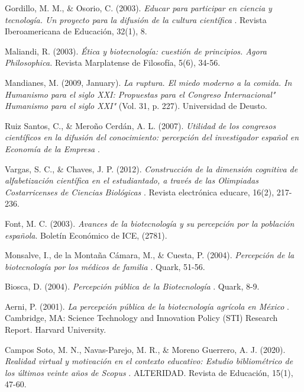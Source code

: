 \documentclass[12pt]{article}
\begin{document}
\newpage
{}
\begin{thebibliography}{X}
	 Gordillo, M. M., \& Osorio, C. (2003). \textit{ Educar para participar en ciencia y tecnología. Un proyecto para la difusión de la cultura científica }. Revista Iberoamericana de Educación, 32(1), 8.
	
	 Maliandi, R. (2003). \textit{ Ética y biotecnología: cuestión de principios. Agora Philosophica. } Revista Marplatense de Filosofía, 5(6), 34-56.
	
	 Mandianes, M. (2009, January). \textit{ La ruptura. El miedo moderno a la comida. In Humanismo para el siglo XXI: Propuestas para el Congreso Internacional" Humanismo para el siglo XXI" } (Vol. 31, p. 227). Universidad de Deusto.
	
	Ruiz Santos, C., \& Meroño Cerdán, A. L. (2007). \textit{ Utilidad de los congresos científicos en la difusión del conocimiento: percepción del investigador español en Economía de la Empresa }.
	
	Vargas, S. C., \& Chaves, J. P. (2012). \textit{ Construcción de la dimensión cognitiva de alfabetización científica en el estudiantado, a través de las Olimpiadas Costarricenses de Ciencias Biológicas }. Revista electrónica educare, 16(2), 217-236.
	
	Font, M. C. (2003). \textit{ Avances de la biotecnología y su percepción por la población española}. Boletín Económico de ICE, (2781).
	
	 Monsalve, I., de la Montaña Cámara, M., \& Cuesta, P. (2004). \textit{ Percepción de la biotecnología por los médicos de familia }. Quark, 51-56.
	
	 Biosca, D. (2004). \textit{ Percepción pública de la Biotecnología }. Quark, 8-9.
	
	Aerni, P. (2001). \textit{ La percepción pública de la biotecnología agrícola en México }. Cambridge, MA: Science Technology and Innovation Policy (STI) Research Report. Harvard University.
	
	 Campos Soto, M. N., Navas-Parejo, M. R., \& Moreno Guerrero, A. J. (2020). \textit{ Realidad virtual y motivación en el contexto educativo: Estudio bibliométrico de los últimos veinte años de Scopus }. ALTERIDAD. Revista de Educación, 15(1), 47-60.
	

\end{thebibliography}
\end{document}
